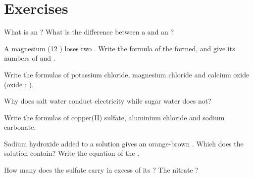 \section{Exercises}

\begin{exercise}[$\star$]\label{exo:g9:ions:1}
What is an ? What is the difference between a  and an ?
\end{exercise}

\begin{exercise}[$\star$]\label{exo:g9:ions:2}
A magnesium  (12 ) loses two . Write the formula of
the  formed, and give its numbers of  and .
\end{exercise}

\begin{exercise}[$\star$]\label{exo:g9:ions:3}
Write the formulas of potassium chloride, magnesium chloride and
calcium oxide (oxide : ).
\end{exercise}

\begin{exercise}[$\star$]\label{exo:g9:ions:4}
Why does salt water conduct electricity while sugar water does not?
\end{exercise}

\begin{exercise}[$\star\star$]\label{exo:g9:ions:5}
Write the formulas of copper(II) sulfate, aluminium chloride and sodium
carbonate.
\end{exercise}

\begin{exercise}[$\star\star$]\label{exo:g9:ions:6}
Sodium hydroxide added to a solution gives an orange-brown .
Which  does the solution contain? Write the equation of the
.
\end{exercise}

\begin{exercise}[$\star\star$]\label{exo:g9:ions:7}
How many  does the sulfate   carry in excess of
its ? The nitrate  ?
\end{exercise}

